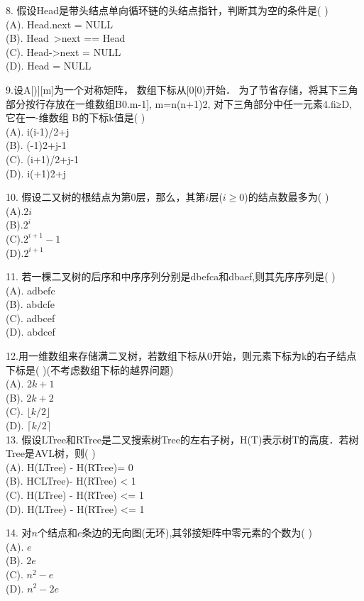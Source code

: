 8. 假设Head是带头结点单向循环链的头结点指针，判断其为空的条件是( ) \\
(A). Head.next = NULL \\
(B). Head~>next == Head \\
(C). Head->next = NULL \\
(D). Head = NULL

9.设A[)][m]为一个对称矩阵， 数组下标从[0[0)开始． 为了节省存储，将其下三角部分按行存放在一维数组B0.m-1], m=n(n+1)2, 对下三角部分中任一元素4.fi≥D, 它在一-维数组 B的下标k值是( ) \\
(A). i(i-1)/2+j \\
(B). (-1)2+j-1 \\
(C). (i+1)/2+j-1 \\
(D). i(+1)2+j

10. 假设二又树的根结点为第$0$层，那么，其第$i$层($i\geqslant0$)的结点数最多为( ) \\
(A).$2i$ \\
(B).$2^i$ \\
(C).$2^{i+1}-1$ \\
(D).$2^{i+1}$

11. 若一棵二叉树的后序和中序序列分别是dbefca和dbaef,则其先序序列是( ) \\
(A). adbefc \\
(B). abdcfe \\
(C). adbcef \\
(D). abdcef

12.用一维数组来存储满二叉树，若数组下标从0开始，则元素下标为k的右子结点下标是( )(不考虑数组下标的越界问题) \\
(A). $2k+1$ \\
(B). $2k+2$ \\
(C). $ \lfloor k/2 \rfloor $ \\
(D). $ \lceil k/2 \rceil $ \\

13. 假设LTree和RTree是二叉搜索树Tree的左右子树，H(T)表示树T的高度．若树Tree是AVL树，则( ) \\
(A). H(LTree) - H(RTree)= 0 \\
(B). HCLTree)- H(RTree) < 1 \\
(C). H(LTree) - H(RTree) <= 1 \\
(D). H(LTree) - H(RTree) <= 1

14. 对$n$个结点和$e$条边的无向图(无环),其邻接矩阵中零元素的个数为( ) \\
(A). $e$ \\
(B). $2e$  \\
(C). $n^2-e$ \\
(D). $n^2-2e$

